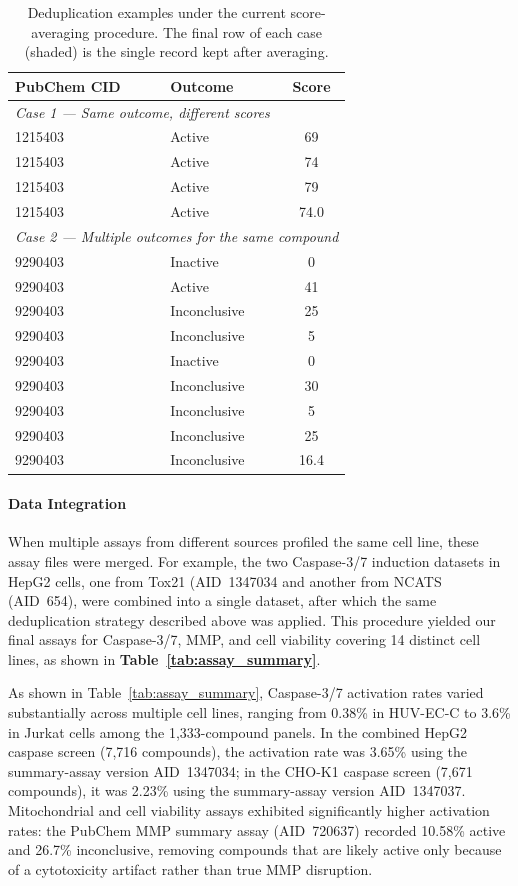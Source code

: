 \documentclass[letterpaper]{article}
\begin{document}
\begin{table}[t]
\centering
\small
\caption{Deduplication examples under the current score-averaging procedure. The final row of each case (shaded) is the single record kept after averaging.}
\label{tab:dedup_example}
\begin{tabular}{llc}
\toprule
\textbf{PubChem CID} & \textbf{Outcome} & \textbf{Score} \\
\midrule
\multicolumn{3}{l}{\textit{Case 1 --- Same outcome, different scores}} \\
\midrule
1215403 & Active & 69 \\
1215403 & Active & 74 \\
1215403 & Active & 79 \\
\rowcolor{yellow!15}
1215403 & Active & 74.0 \\
\midrule
\multicolumn{3}{l}{\textit{Case 2 --- Multiple outcomes for the same compound}} \\
\midrule
9290403 & Inactive & 0 \\
9290403 & Active & 41 \\
9290403 & Inconclusive & 25 \\
9290403 & Inconclusive & 5 \\
9290403 & Inactive & 0 \\
9290403 & Inconclusive & 30 \\
9290403 & Inconclusive & 5 \\
9290403 & Inconclusive & 25 \\
\rowcolor{yellow!15}
9290403 & Inconclusive & 16.4 \\
\bottomrule
\end{tabular}
\end{table}

\paragraph{Data Integration}

When multiple assays from different
sources profiled the same cell line, these assay files were merged. For example, the two
Caspase-3/7 induction datasets in HepG2 cells, one from Tox21
(AID~1347034 and another from NCATS (AID~654), were combined into a
single dataset, after which the same deduplication strategy described
above was applied. This procedure yielded our final assays for Caspase-3/7, MMP, and cell viability covering 14 distinct cell lines, as shown in \textbf{Table~\ref{tab:assay_summary}}.

As shown in Table~\ref{tab:assay_summary}, Caspase-3/7 activation rates varied substantially across multiple cell lines, ranging from 0.38\% in HUV-EC-C to 3.6\% in Jurkat cells among the 1,333-compound panels. In the combined HepG2 caspase screen (7,716 compounds), the activation rate was 3.65\% using the summary-assay version AID~1347034; in the CHO-K1 caspase screen (7,671 compounds), it was 2.23\% using the summary-assay version AID~1347037. Mitochondrial and cell viability assays exhibited significantly higher activation rates: the PubChem MMP summary assay (AID~720637) recorded 10.58\% active and 26.7\% inconclusive, removing compounds that are likely active only because of a cytotoxicity artifact rather than true MMP disruption.
\end{document}
